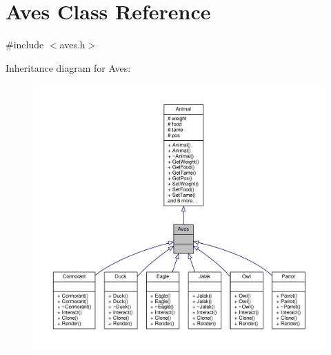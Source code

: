 \hypertarget{classAves}{}\section{Aves Class Reference}
\label{classAves}


{\ttfamily \#include $<$aves.\+h$>$}



Inheritance diagram for Aves\+:
\nopagebreak
\begin{figure}[H]
\begin{center}
\leavevmode
\includegraphics[width=350pt]{classAves__inherit__graph}
\end{center}
\end{figure}


